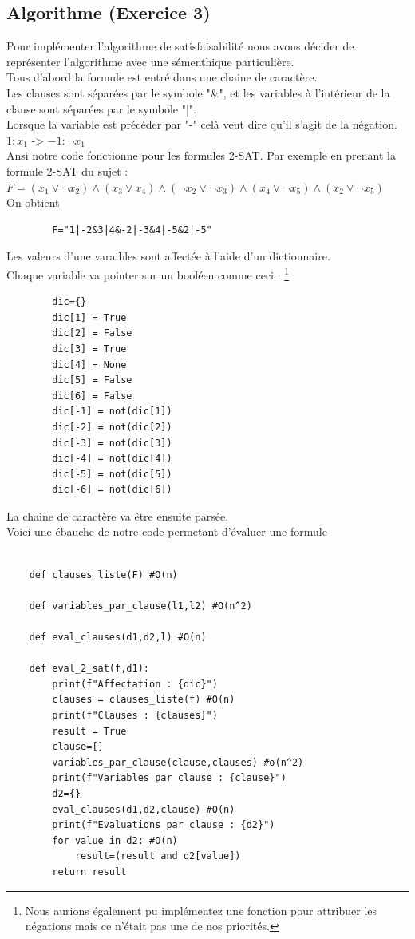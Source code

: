 \documentclass{article}
\begin{document}
    \subsection{Algorithme (Exercice 3)}
    Pour implémenter l'algorithme de satisfaisabilité nous avons décider de représenter l'algorithme avec une sémenthique particulière. \\
    Tous d'abord la formule est entré dans une chaine de caractère. \\
    Les clauses sont séparées par le symbole "\&", et les variables à l'intérieur de la clause sont séparées par le symbole "|". \\
    Lorsque la variable est précéder par "-" celà veut dire qu'il s'agit de la négation. \\
    $1 : x_1$ -> $-1 : \neg{x_1}$ \\
    Ansi notre code fonctionne pour les formules 2-SAT.
     Par exemple en prenant la formule 2-SAT du sujet : \\ $F=(x_1 \lor \neg x_2) \wedge (x_3 \lor x_4) \wedge (\neg x_2 \lor \neg x_3) \wedge (x_4 \lor \neg x_5) \wedge (x_2 \lor \neg x_5)$
     \\On obtient \begin{lstlisting}
        F="1|-2&3|4&-2|-3&4|-5&2|-5"
     \end{lstlisting}
     Les valeurs d'une varaibles sont affectée à l'aide d'un dictionnaire. \\
     Chaque variable va pointer sur un booléen comme ceci : 
     \footnote{Nous aurions également pu implémentez une fonction pour attribuer les négations mais ce n'était pas une de nos priorités.}
     \begin{lstlisting}
        dic={}
        dic[1] = True
        dic[2] = False
        dic[3] = True
        dic[4] = None
        dic[5] = False
        dic[6] = False
        dic[-1] = not(dic[1])
        dic[-2] = not(dic[2])
        dic[-3] = not(dic[3])
        dic[-4] = not(dic[4])
        dic[-5] = not(dic[5])
        dic[-6] = not(dic[6])
     \end{lstlisting} 
    La chaine de caractère va être ensuite parsée. \\
    Voici une ébauche de notre code permetant d'évaluer une formule 
    \begin{lstlisting}

    def clauses_liste(F) #O(n)

    def variables_par_clause(l1,l2) #O(n^2)

    def eval_clauses(d1,d2,l) #O(n)

    def eval_2_sat(f,d1):
        print(f"Affectation : {dic}")
        clauses = clauses_liste(f) #O(n)
        print(f"Clauses : {clauses}")
        result = True
        clause=[]
        variables_par_clause(clause,clauses) #o(n^2)
        print(f"Variables par clause : {clause}")
        d2={}
        eval_clauses(d1,d2,clause) #O(n)
        print(f"Evaluations par clause : {d2}")
        for value in d2: #O(n)
            result=(result and d2[value])
        return result

    \end{lstlisting}
\end{document}
